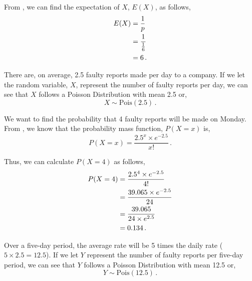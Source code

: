 \begin{subquestions}
\begin{subsubquestions}
\subsubquestion

From , we can find the expectation of $X$, $E(X)$, as follows,
\begin{align}
	E(X) & = \frac{1}{p} \nonumber \\
	     & = \frac{1}{\frac{1}{6}} \nonumber \\
	     & = 6 \,.
\end{align}

\end{subsubquestions}


\subquestion

There are, on average, 2.5 faulty reports made per day to a company. If we let the random variable, $X$, represent the number of faulty reports per day, we can see that $X$ follows a Poisson Distribution with mean 2.5 or,
\begin{equation}
	X \sim \text{Pois}(2.5) \,.
\end{equation}

\begin{subsubquestions}
	
\subsubquestion

We want to find the probability that 4 faulty reports will be made on Monday. From , we know that the probability mass function, $P(X=x)$ is,
\begin{equation}
	P(X=x) = \frac{2.5^x \times e^{-2.5}}{x!} \,.
\end{equation}

Thus, we can calculate $P(X=4)$ as follows,
\begin{align}
	P(X=4) & = \frac{2.5^4 \times e^{-2.5}}{4!} \nonumber \\
	       & = \frac{39.065 \times e^{-2.5}}{24} \nonumber \\
	       & = \frac{39.065}{24 \times e^{2.5}} \nonumber \\
	       & = 0.134 \,.
\end{align}
	

\subsubquestion

Over a five-day period, the average rate will be 5 times the daily rate ($5 \times 2.5 = 12.5$). If we let $Y$ represent the number of faulty reports per five-day period, we can see that $Y$ follows a Poisson Distribution with mean 12.5 or,
\begin{equation}
	Y \sim \text{Pois}(12.5) \,.
\end{equation}


\end{subsubquestions}
\end{subquestions}
